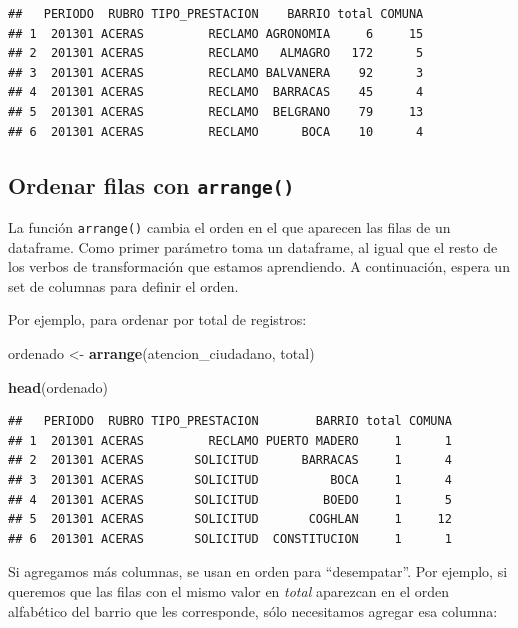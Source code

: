 \documentclass[spanish,]{book}
\newenvironment{Shaded}{\begin{snugshade}}{\end{snugshade}}
\newcommand{\KeywordTok}[1]{\textcolor[rgb]{0.13,0.29,0.53}{\textbf{#1}}}
\newcommand{\NormalTok}[1]{#1}
\newcommand{\StringTok}[1]{\textcolor[rgb]{0.31,0.60,0.02}{#1}}
\begin{document}
\begin{verbatim}
##   PERIODO  RUBRO TIPO_PRESTACION    BARRIO total COMUNA
## 1  201301 ACERAS         RECLAMO AGRONOMIA     6     15
## 2  201301 ACERAS         RECLAMO   ALMAGRO   172      5
## 3  201301 ACERAS         RECLAMO BALVANERA    92      3
## 4  201301 ACERAS         RECLAMO  BARRACAS    45      4
## 5  201301 ACERAS         RECLAMO  BELGRANO    79     13
## 6  201301 ACERAS         RECLAMO      BOCA    10      4
\end{verbatim}

\hypertarget{ordenar-filas-con-arrange}{%
\subsection{\texorpdfstring{Ordenar filas con \texttt{arrange()}}{Ordenar filas con arrange()}}\label{ordenar-filas-con-arrange}}

La función \texttt{arrange()} cambia el orden en el que aparecen las filas de un dataframe. Como primer parámetro toma un dataframe, al igual que el resto de los verbos de transformación que estamos aprendiendo. A continuación, espera un set de columnas para definir el orden.

Por ejemplo, para ordenar por total de registros:

\begin{Shaded}
\begin{Highlighting}[]
\NormalTok{ordenado <-}\StringTok{ }\KeywordTok{arrange}\NormalTok{(atencion_ciudadano, total)}

\KeywordTok{head}\NormalTok{(ordenado)}
\end{Highlighting}
\end{Shaded}

\begin{verbatim}
##   PERIODO  RUBRO TIPO_PRESTACION        BARRIO total COMUNA
## 1  201301 ACERAS         RECLAMO PUERTO MADERO     1      1
## 2  201301 ACERAS       SOLICITUD      BARRACAS     1      4
## 3  201301 ACERAS       SOLICITUD          BOCA     1      4
## 4  201301 ACERAS       SOLICITUD         BOEDO     1      5
## 5  201301 ACERAS       SOLICITUD       COGHLAN     1     12
## 6  201301 ACERAS       SOLICITUD  CONSTITUCION     1      1
\end{verbatim}

Si agregamos más columnas, se usan en orden para ``desempatar''. Por ejemplo, si queremos que las filas con el mismo valor en \emph{total} aparezcan en el orden alfabético del barrio que les corresponde, sólo necesitamos agregar esa columna:
\end{document}
